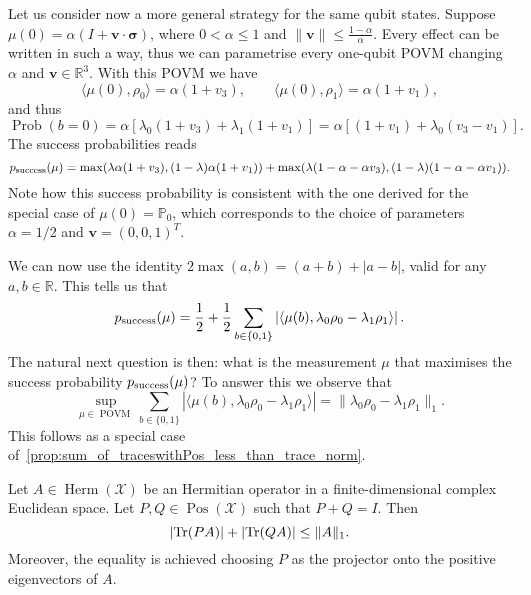 \documentclass[12pt]{report}
\newcommand{\PP}{\mathbb{P}}
\newcommand{\RR}{\mathbb{R}}
\newcommand{\on}[1]{\operatorname{#1}}
\newcommand{\bs}[1]{\boldsymbol{#1}}
\newcommand{\calX}{{\mathcal{X}}}
\DeclareMathOperator{\Pos}{Pos}
\DeclareMathOperator{\Herm}{Herm}
\DeclareMathOperator{\Prob}{Prob}
\begin{document}
\begin{example}
	Let us consider now a more general strategy for the same qubit states.
	Suppose $\mu(0)= \alpha(I+\bs v\cdot\bs\sigma)$, where $0<\alpha\le1$ and $\|\bs v\|\le \frac{1-\alpha}{\alpha}$. Every effect can be written in such a way, thus we can parametrise every one-qubit POVM changing $\alpha$ and $\bs v\in\RR^3$. With this POVM we have
	\begin{equation}
		\langle\mu(0),\rho_0\rangle = \alpha(1+v_3),
		\qquad
		\langle\mu(0),\rho_1\rangle = \alpha(1+v_1),
	\end{equation}
	and thus
	\begin{equation}
		\Prob(b=0) = \alpha[\lambda_0(1+v_3) + \lambda_1(1+v_1)]
		= \alpha[(1+v_1) + \lambda_0 (v_3-v_1)].
	\end{equation}
	The success probabilities reads
	\begin{equation}
		p_{\rm success}(\mu)
		= \max(
		\lambda\alpha(1+v_3),
		(1-\lambda)\alpha(1+v_1)
		) +
		\max(
		\lambda(1-\alpha-\alpha v_3),
		(1-\lambda)(1-\alpha-\alpha v_1)
		).
		\label{eq:QST:success_prob_in_example_general_POVM}
	\end{equation}
	Note how this success probability is consistent with the one derived for the special case of $\mu(0)=\PP_0$, which corresponds to the choice of parameters $\alpha=1/2$ and $\bs v=(0,0,1)^T$.
\end{example}


We can now use the identity $2\max(a,b)=(a+b)+|a-b|$, valid for any $a,b\in\RR$. This tells us that
\begin{equation}
	p_{\rm success}(\mu)
	= \frac12 + \frac12
	\sum_{b\in\{0,1\}} \left\lvert
	\langle\mu(b), \lambda_0 \rho_0 - \lambda_1\rho_1\rangle
	\right\rvert.
\end{equation}
The natural next question is then: what is the measurement $\mu$ that maximises the success probability $p_{\rm success}(\mu)$?
To answer this we observe that
\begin{equation}
	\sup_{\mu\in\on{POVM}}
	\sum_{b\in\{0,1\}} \left\lvert
	\langle\mu(b), \lambda_0 \rho_0 - \lambda_1\rho_1\rangle
	\right\rvert
	= \|\lambda_0 \rho_0 - \lambda_1\rho_1\|_1.
\end{equation}
This follows as a special case of~\cref{prop:sum_of_traceswithPos_less_than_trace_norm}.

\begin{prop}
	Let $A\in\Herm(\calX)$ be an Hermitian operator in a finite-dimensional complex Euclidean space.
	Let $P,Q\in\Pos(\calX)$ such that $P+Q=I$. Then
	\begin{equation}
		\lvert \Tr(PA)\rvert
		+ \lvert \Tr(QA)\rvert \le \|A\|_1.
	\end{equation}
	Moreover, the equality is achieved choosing $P$ as the projector onto the positive eigenvectors of $A$.
	\label{prop:sum_of_traceswithPos_less_than_trace_norm}
\end{prop}
\end{document}
